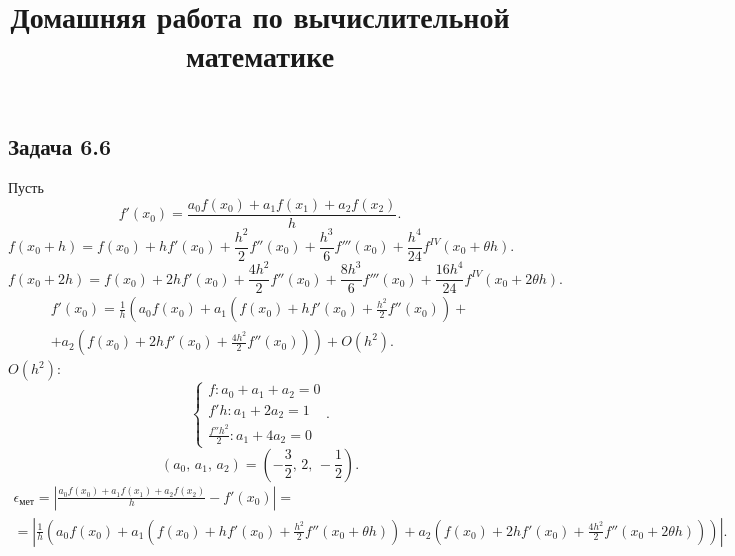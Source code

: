 \documentclass[a4paper]{article}
\title{Домашняя работа по вычислительной математике}
\begin{document}
	\maketitle
\subsection{Задача 6.6}
\begin{sol}
	Пусть
	\[
		f'(x_0)=
		\frac{a_0 f(x_0) + a_1 f(x_1)+ a_2 f(x_2)}{h}
	.\] 
	\[
		f(x_0+h)= f(x_0)+ h f'(x_0)+\frac{h^2}{2}
		f''(x_0) + \frac{h^3}{6} f'''(x_0)+
		\frac{h^4}{24} f^{IV} (x_0+\theta h)
	.\] 
	\[
		f(x_0+2h)= f(x_0)+ 2h f'(x_0)+\frac{4h^2}{2}
		f''(x_0) + \frac{8h^3}{6} f'''(x_0)+
		\frac{16h^4}{24} f^{IV} (x_0+2\theta h)
	.\] 
	\begin{multline*}
		f'(x_0)= \frac{1}{h}\left( 
		a_0 f (x_0) + a_1 \left( f(x_0)+h f'(x_0)+
	\frac{h^2}{2} f''(x_0)\right)\right. +\\ \left.+a_2\left( f(x_0)+ 2h f'(x_0)+\frac{4h^2}{2}f''(x_0) \right)\right) +O(h^2)
	.\end{multline*} 
	$O(h^2)$:
	\[
	\left\{
	\begin{aligned}
	f: a_0+a_1+a_2=0\\
	f' h : a_1+2a_2=1\\
	\frac{f'' h^2}{2}: a_1+4a_2=0
	\end{aligned}
	\right.
	.\] 
 \[
	 (a_0,\,a_1,\,a_2)= \left( -\frac{3}{2},\, 2,\,-\frac{1}{2} \right) 
.\] 
\begin{multline*}
\epsilon_\text{мет}= \left| 
\frac{a_0 f(x_0) + a_1 f(x_1)+ a_2 f(x_2)}{h}-f'(x_0)
\right| =\\=
\left| 
\frac{1}{h}\left( 
		a_0 f (x_0) + a_1 \left( f(x_0)+h f'(x_0)+
	\frac{h^2}{2} f''(x_0+\theta h)\right) +a_2\left( f(x_0)+ 2h f'(x_0)+\frac{4h^2}{2}f''(x_0+2\theta h) \right)\right)
\right| 
.\end{multline*} 


\end{sol}
\end{document}
